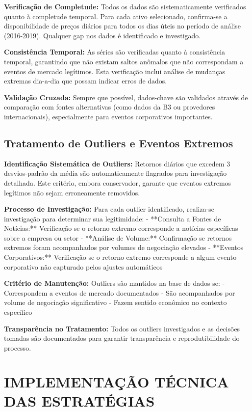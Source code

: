 \textbf{Verificação de Completude:} Todos os dados são sistematicamente verificados quanto à completude temporal. Para cada ativo selecionado, confirma-se a disponibilidade de preços diários para todos os dias úteis no período de análise (2016-2019). Qualquer gap nos dados é identificado e investigado.

\textbf{Consistência Temporal:} As séries são verificadas quanto à consistência temporal, garantindo que não existam saltos anômalos que não correspondam a eventos de mercado legítimos. Esta verificação inclui análise de mudanças extremas dia-a-dia que possam indicar erros de dados.

\textbf{Validação Cruzada:} Sempre que possível, dados-chave são validados através de comparação com fontes alternativas (como dados da B3 ou provedores internacionais), especialmente para eventos corporativos importantes.

\subsection{Tratamento de Outliers e Eventos Extremos}

\textbf{Identificação Sistemática de Outliers:} Retornos diários que excedem 3 desvios-padrão da média são automaticamente flagrados para investigação detalhada. Este critério, embora conservador, garante que eventos extremos legítimos não sejam erroneamente removidos.

\textbf{Processo de Investigação:} Para cada outlier identificado, realiza-se investigação para determinar sua legitimidade:
- **Consulta a Fontes de Notícias:** Verificação se o retorno extremo corresponde a notícias específicas sobre a empresa ou setor
- **Análise de Volume:** Confirmação se retornos extremos foram acompanhados por volumes de negociação elevados
- **Eventos Corporativos:** Verificação se o retorno extremo corresponde a algum evento corporativo não capturado pelos ajustes automáticos

\textbf{Critério de Manutenção:} Outliers são mantidos na base de dados se:
- Correspondem a eventos de mercado documentados
- São acompanhados por volume de negociação significativo
- Fazem sentido econômico no contexto específico

\textbf{Transparência no Tratamento:} Todos os outliers investigados e as decisões tomadas são documentados para garantir transparência e reprodutibilidade do processo.

\section{IMPLEMENTAÇÃO TÉCNICA DAS ESTRATÉGIAS}

